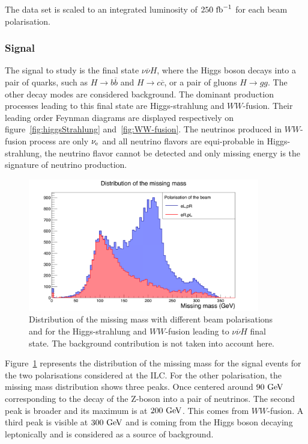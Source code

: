      The data set is scaled to an integrated luminosity of $250~\rm{fb}^{-1}$ for each beam polarisation.

  \subsubsection{Signal}

    The signal to study is the final state $\nu\overline{\nu}H$, where the Higgs boson decays into a pair of quarks, such as $H \rightarrow b\overline{b}$ and $H \rightarrow c\overline{c}$, or a pair of gluons $H \rightarrow gg$. 
    The other decay modes are considered background. 
    The dominant production processes leading to this final state are Higgs-strahlung and $WW$-fusion.
    Their leading order Feynman diagrams are displayed respectively on figure~\ref{fig:higgsStrahlung} and~\ref{fig:WW-fusion}.
    The neutrinos produced in $WW$-fusion process are only $\nu_{\rm{e}}$ and all neutrino flavors are equi-probable in Higgs-strahlung, the neutrino flavor cannot be detected and only missing energy is the signature of neutrino production.

    \begin{figure}[!tbh]
      \centering
      \includegraphics[width = 0.9\textwidth]{Pictures/Higgs/mMiss.png}
      \caption{Distribution of the missing mass with different beam polarisations and for the Higgs-strahlung and $WW$-fusion leading to $\nu\overline{\nu}H$ final state.
      The background contribution is not taken into account here.}
      \label{fig:mMiss}
    \end{figure}

    Figure~\ref{fig:mMiss} represents the distribution of the missing mass for the signal events for the two polarisations considered at the \gls{ILC}.
  For the other polarisation, the missing mass distribution shows three peaks. 
    Once centered around $90~\rm{GeV}$ corresponding to the decay of the Z-boson into a pair of neutrinos.
    The second peak is broader and its maximum is at $200~\rm{GeV}$.
    This comes from $WW$-fusion.
    A third peak is visible at $300~\rm{GeV}$ and is coming from the Higgs boson decaying leptonically and is considered as a source of background.    

